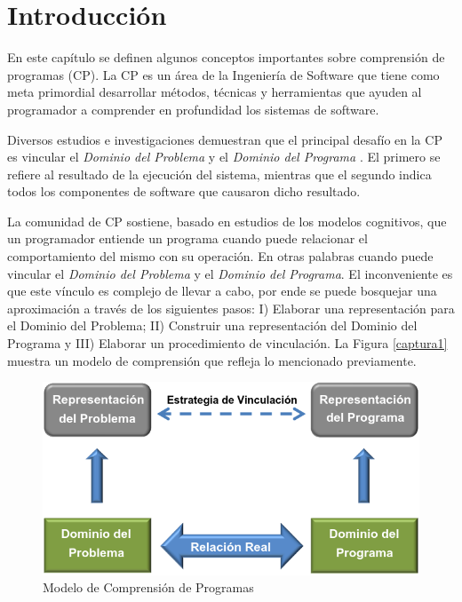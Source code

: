 
\section{Introducción}

En este capítulo se definen algunos conceptos importantes sobre comprensión de programas (CP).
La CP es un área de la Ingeniería de Software que tiene como meta primordial desarrollar métodos, técnicas y herramientas que ayuden al programador a comprender en profundidad los sistemas de software. 

Diversos estudios e investigaciones demuestran que el principal desafío en la CP es vincular el \textit{Dominio del Problema} y el \textit{Dominio del Programa} \cite{BRM10,MPMR07,MBPHRU10,DWE04}. El primero se refiere al resultado de la ejecución del sistema, mientras que el segundo indica todos los componentes de software que causaron dicho resultado. 

La comunidad de CP sostiene, basado en estudios de los modelos cognitivos, que un programador entiende un programa cuando puede relacionar el comportamiento del mismo con su operación. En otras palabras cuando puede vincular el \textit{Dominio del Problema} y el \textit{Dominio del Programa}. El inconveniente es que este vínculo es complejo de llevar a cabo, por ende se puede bosquejar una aproximación a través de los siguientes pasos: I) Elaborar una representación para el Dominio del Problema; II) Construir una representación del Dominio del Programa y III) Elaborar un procedimiento de vinculación. La Figura \ref{captura1} muestra un modelo de comprensión que refleja lo mencionado previamente.

\begin{figure}[t] %
\centerline{%
\includegraphics[scale= 0.7]{./cap2/dom.png}
}
\caption{Modelo de Comprensión de Programas}
\end{figure} \label{captura1}
 
